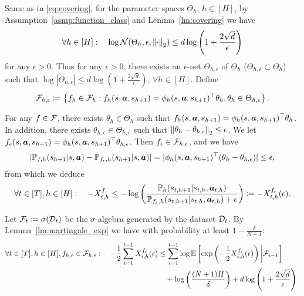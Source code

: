 Same as in \eqref{eq:covering}, for the parameter spaces $\Theta_h$, $h\in[H]$, by Assumption~\ref{asmp:function_class} and Lemma~\ref{lm:covering} we have
\begin{align}\label{eq:covering_mg}
    \forall h\in[H]:\quad\log {\mathcal{N}}(\Theta_h,\epsilon,\left\| \cdot \right\|_2)\leq d\log\left(1+\frac{2\sqrt{d}}{\epsilon}\right)
\end{align}
for any $\epsilon>0$. Thus for any $\epsilon>0$, there exists an $\epsilon$-net $\Theta_{h,\epsilon}$ of $\Theta_h$ ($\Theta_{h,\epsilon}\subset\Theta_h$) such that $\log|\Theta_{h,\epsilon}|\leq d\log\left(1+\frac{2\sqrt{d}}{\epsilon}\right)$, $\forall h\in[H]$.
Define
\begin{align*}
    {\mathcal{F}}_{h,\epsilon} \coloneqq \left\{f_h\in{\mathcal{F}}_h: f_h(s,{\bm{a}},s_{h+1})=\phi_h(s,{\bm{a}},s_{h+1})^\top\theta_h,\theta_h\in\Theta_{h,\epsilon}\right\}.
\end{align*}


For any $f\in{\mathcal{F}}$, there exists $\theta_h\in\Theta_h$ such that $f_h(s,{\bm{a}},s_{h+1})=\phi_h(s,{\bm{a}},s_{h+1})^\top\theta_h$. In addition, there exists $\theta_{h,\epsilon}\in\Theta_{h,\epsilon}$ such that $\left\| \theta_h-\theta_{h,\epsilon} \right\|_2\leq \epsilon$. We let $f_\epsilon(s,{\bm{a}},s_{h+1})=\phi_h(s,{\bm{a}},s_{h+1})^\top\theta_{h,\epsilon}$. Then $f_\epsilon\in{\mathcal{F}}_{h,\epsilon}$, and we have
\begin{align}\label{eq:diff_eps}
    |{\mathbb P}_{f,h}(s_{h+1}|s,{\bm{a}})-{\mathbb P}_{f_\epsilon,h}(s_{h+1}|s,{\bm{a}})|=|\phi_h(s,{\bm{a}},s_{h+1})^\top(\theta_h-\theta_{h,\epsilon})|\leq \epsilon,
\end{align}
from which we deduce
\begin{align}\label{eq:diff_net_approx}
    \forall t\in[T],h\in[H]:\quad -X_{t,h}^f\leq -\log\left(\frac{{\mathbb P}_h(s_{t,h+1}|s_{t,h},{\bm{a}}_{t,h})}{{\mathbb P}_{f_\epsilon,h}(s_{t,h+1}|s_{t,h},{\bm{a}}_{t,h})+\epsilon}\right)\coloneqq -X_{t,h}^{f_\epsilon}(\epsilon).
\end{align}

Let ${\mathcal{F}}_t\coloneqq \sigma({\mathcal{D}}_t)$ be the $\sigma$-algebra generated by the dataset ${\mathcal{D}}_t$. 
By Lemma~\ref{lm:martingale_exp} we have 
with probability at least $1-\frac{\delta}{N+1}$:
\begin{align}\label{eq:exp_concentration_net}
   \forall t\in[T],h\in[H],f_{h,\epsilon}\in{\mathcal{F}}_{h,\epsilon}: \quad -\frac{1}{2}\sum_{i=1}^{t-1} X^{f_\epsilon}_{i,h}(\epsilon) &\leq \sum_{i=1}^{t-1} \log\mathbb{E}\left[\exp\left(-\frac{1}{2}X^{f_\epsilon}_{i,h}(\epsilon)\right)\bigg|{\mathcal{F}}_{i-1}\right] \notag\\
   &\quad+ \log\left(\frac{(N+1)H}{\delta}\right) + d\log\left(1+\frac{2\sqrt{d}}{\epsilon}\right).
\end{align}


